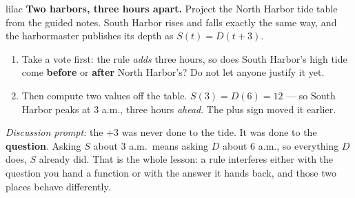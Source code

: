 \documentclass[10pt]{article}
\begin{document}
\begin{skillbox}[Hook]{lilac}
    \textbf{Two harbors, three hours apart.} Project the North Harbor tide
    table from the guided notes. South Harbor rises and falls exactly the same
    way, and the harbormaster publishes its depth as $S(t) = D(t+3)$.
    \begin{enumerate}[itemsep=2pt]
        \item Take a vote first: the rule \textit{adds} three hours, so does
              South Harbor's high tide come \textbf{before} or \textbf{after}
              North Harbor's? Do not let anyone justify it yet.
        \item Then compute two values off the table. $S(3) = D(6) = 12$ --- so
              South Harbor peaks at 3 a.m., three hours \textit{ahead}. The
              plus sign moved it earlier.
    \end{enumerate}
    \textit{Discussion prompt:} the $+3$ was never done to the tide. It was
    done to the \textbf{question}. Asking $S$ about 3 a.m.\ means asking $D$
    about 6 a.m., so everything $D$ does, $S$ already did. That is the whole
    lesson: a rule interferes either with the question you hand a function or
    with the answer it hands back, and those two places behave differently.
\end{skillbox}
\end{document}
